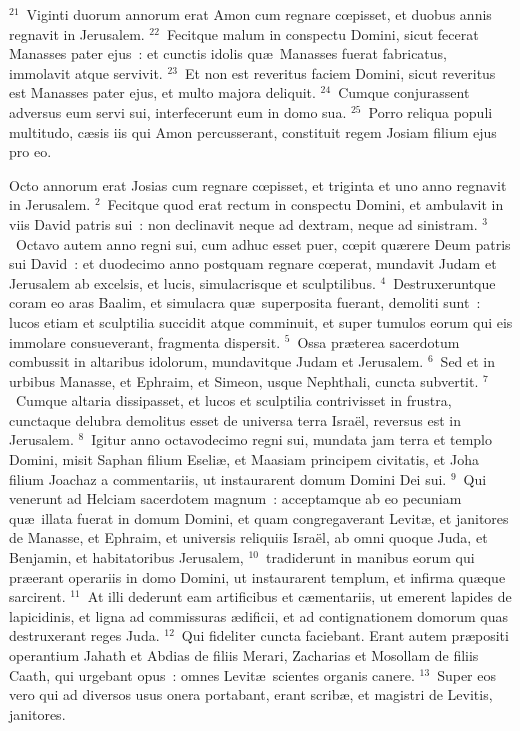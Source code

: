 ${}^{21}$~Viginti duorum annorum erat Amon cum regnare cœpisset, et duobus annis regnavit in Jerusalem.
${}^{22}$~Fecitque malum in conspectu Domini, sicut fecerat Manasses pater ejus~: et cunctis idolis qu\ae\ Manasses fuerat fabricatus, immolavit atque servivit.
${}^{23}$~Et non est reveritus faciem Domini, sicut reveritus est Manasses pater ejus, et multo majora deliquit.
${}^{24}$~Cumque conjurassent adversus eum servi sui, interfecerunt eum in domo sua.
${}^{25}$~Porro reliqua populi multitudo, c\ae sis iis qui Amon percusserant, constituit regem Josiam filium ejus pro eo.

\lettrine[lines=10,image=true,loversize=0.05,lraise=-0.03]{O}{}cto annorum erat Josias cum regnare cœpisset, et triginta et uno anno regnavit in Jerusalem.
${}^{2}$~Fecitque quod erat rectum in conspectu Domini, et ambulavit in viis David patris sui~: non declinavit neque ad dextram, neque ad sinistram.
${}^{3}$~Octavo autem anno regni sui, cum adhuc esset puer, cœpit qu\ae rere Deum patris sui David~: et duodecimo anno postquam regnare cœperat, mundavit Judam et Jerusalem ab excelsis, et lucis, simulacrisque et sculptilibus.
${}^{4}$~Destruxeruntque coram eo aras Baalim, et simulacra qu\ae\ superposita fuerant, demoliti sunt~: lucos etiam et sculptilia succidit atque comminuit, et super tumulos eorum qui eis immolare consueverant, fragmenta dispersit.
${}^{5}$~Ossa pr\ae terea sacerdotum combussit in altaribus idolorum, mundavitque Judam et Jerusalem.
${}^{6}$~Sed et in urbibus Manasse, et Ephraim, et Simeon, usque Nephthali, cuncta subvertit.
${}^{7}$~Cumque altaria dissipasset, et lucos et sculptilia contrivisset in frustra, cunctaque delubra demolitus esset de universa terra Isra\"el, reversus est in Jerusalem.
${}^{8}$~Igitur anno octavodecimo regni sui, mundata jam terra et templo Domini, misit Saphan filium Eseli\ae , et Maasiam principem civitatis, et Joha filium Joachaz a commentariis, ut instaurarent domum Domini Dei sui.
${}^{9}$~Qui venerunt ad Helciam sacerdotem magnum~: acceptamque ab eo pecuniam qu\ae\ illata fuerat in domum Domini, et quam congregaverant Levit\ae , et janitores de Manasse, et Ephraim, et universis reliquiis Isra\"el, ab omni quoque Juda, et Benjamin, et habitatoribus Jerusalem,
${}^{10}$~tradiderunt in manibus eorum qui pr\ae erant operariis in domo Domini, ut instaurarent templum, et infirma qu\ae que sarcirent.
${}^{11}$~At illi dederunt eam artificibus et c\ae mentariis, ut emerent lapides de lapicidinis, et ligna ad commissuras \ae dificii, et ad contignationem domorum quas destruxerant reges Juda.
${}^{12}$~Qui fideliter cuncta faciebant. Erant autem pr\ae positi operantium Jahath et Abdias de filiis Merari, Zacharias et Mosollam de filiis Caath, qui urgebant opus~: omnes Levit\ae\ scientes organis canere.
${}^{13}$~Super eos vero qui ad diversos usus onera portabant, erant scrib\ae , et magistri de Levitis, janitores.


